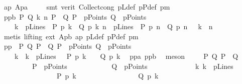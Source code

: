 \begin{isabellebody}
\ ap\ Ap{}a\ \isanewline
\ \ \isamarkupfalse%
\ {\isacharparenleft}{\kern0pt}smt\ {\isacharparenleft}{\kern0pt}verit{\isacharparenright}{\kern0pt}\ Collect{\isacharunderscore}{\kern0pt}cong\ pLdef\ pPdef\ pm{\isacharparenright}{\kern0pt}\ \isanewline
\ \ \isamarkupfalse%
\ pp{}b{\isacharcolon}{\kern0pt}\ {\isachardoublequoteopen}{\isasymAnd}P\ Q\ k\ n\ {\isachardot}{\kern0pt}{\isasymlbrakk}P\ {\isasymnoteq}\ Q{\isacharsemicolon}{\kern0pt}\ P\ {\isasymin}\ pPoints{\isacharsemicolon}{\kern0pt}\ Q\ {\isasymin}\ pPoints{\isacharsemicolon}{\kern0pt}\ \isanewline
\ \ \ \ k\ {\isasymin}\ pLines{\isacharsemicolon}{\kern0pt}\ \ P\ p{\isasymlhd}\ k{\isacharsemicolon}{\kern0pt}\ \ Q\ p{\isasymlhd}\ k{\isacharsemicolon}{\kern0pt}\ n\ {\isasymin}\ pLines{\isacharsemicolon}{\kern0pt}\ \ P\ p{\isasymlhd}\ n{\isacharsemicolon}{\kern0pt}\ \ Q\ p{\isasymlhd}\ n{\isasymrbrakk}\ \ {\isasymLongrightarrow}\ k\ {\isacharequal}{\kern0pt}\ n{\isachardoublequoteclose}\ \isanewline
\ \ \ \ \isamarkupfalse%
\ {\isacharparenleft}{\kern0pt}metis\ {\isacharparenleft}{\kern0pt}lifting{\isacharparenright}{\kern0pt}\ ext\ Ap{}b\ ap\ pLdef\ pPdef\ pm{\isacharparenright}{\kern0pt}\isanewline
\ \ \isamarkupfalse%
\ pp{}{\isacharcolon}{\kern0pt}\ \ {\isachardoublequoteopen}{\isasymAnd}P\ Q\ {\isachardot}{\kern0pt}{\isasymlbrakk}P\ {\isasymnoteq}\ Q{\isacharsemicolon}{\kern0pt}\ P\ {\isasymin}\ pPoints{\isacharsemicolon}{\kern0pt}\ Q\ {\isasymin}\ pPoints{\isasymrbrakk}\ {\isasymLongrightarrow}\ \isanewline
\ \ \ \ {\isacharparenleft}{\kern0pt}{\isasymexists}{\isacharbang}{\kern0pt}k\ {\isachardot}{\kern0pt}\ k\ {\isasymin}\ pLines\ {\isasymand}\ \ P\ p{\isasymlhd}\ k\ \ {\isasymand}\ \ Q\ p{\isasymlhd}\ k{\isacharparenright}{\kern0pt}{\isachardoublequoteclose}\ \isamarkupfalse%
\ pp{}a\ pp{}b\ \isamarkupfalse%
\ meson\isanewline
\ \ \isamarkupfalse%
\ {\isachardoublequoteopen}\ {\isasymAnd}P\ Q{\isachardot}{\kern0pt}\ P\ {\isasymnoteq}\ Q\ {\isasymLongrightarrow}\isanewline
\ \ \ \ \ \ \ \ \ P\ {\isasymin}\ pPoints\ {\isasymLongrightarrow}\isanewline
\ \ \ \ \ \ \ \ \ \ \ Q\ {\isasymin}\ pPoints\ \ {\isasymLongrightarrow}\isanewline
\ \ \ \ \ \ \ \ \ \ \ {\isasymexists}{\isacharbang}{\kern0pt}k{\isachardot}{\kern0pt}\ k\ {\isasymin}\ pLines\ \ {\isasymand}\isanewline
\ \ \ \ \ \ \ \ \ \ \ \ \ \ \ \ P\ p{\isasymlhd}\ k\ {\isasymand}\isanewline
\ \ \ \ \ \ \ \ \ \ \ \ \ \ \ \ Q\ p{\isasymlhd}\ k{\isachardoublequoteclose}\isanewline

\end{isabellebody}
